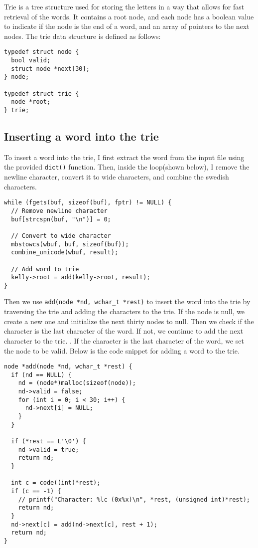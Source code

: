 \documentclass[a4paper,11pt]{article}
\begin{document}
Trie is a tree structure used for storing the letters in a way that allows for fast retrieval of the words.
It contains a root node, and each node has a boolean value to indicate if the node is the end of a word, 
and an array of pointers to the next nodes. The trie data structure is defined as follows:

\begin{verbatim}
typedef struct node {
  bool valid;
  struct node *next[30];
} node;

typedef struct trie {
  node *root;
} trie;
\end{verbatim}

\subsection*{Inserting a word into the trie}

To insert a word into the trie, I first extract the word from the input file using the provided {\tt dict()}
function. Then, inside the loop(shown below), I remove the newline character, convert it to wide characters,
and combine the swedish characters.

\begin{verbatim}
while (fgets(buf, sizeof(buf), fptr) != NULL) {
  // Remove newline character
  buf[strcspn(buf, "\n")] = 0;

  // Convert to wide character
  mbstowcs(wbuf, buf, sizeof(buf));
  combine_unicode(wbuf, result);

  // Add word to trie
  kelly->root = add(kelly->root, result);
}
\end{verbatim}

Then we use {\tt *add(node *nd, wchar\_t *rest)} to insert the word 
into the trie by traversing the trie and adding the characters to the trie. 
If the node is null, we create a new one and initialize the next thirty nodes to null.
Then we check if the character is the last character of the word. If not, we continue to add the next character to the trie.
. If the character is the last character of the word, we set the node to be valid.
Below is the code snippet for adding a word to the trie.

\begin{verbatim}
node *add(node *nd, wchar_t *rest) {
  if (nd == NULL) {
    nd = (node*)malloc(sizeof(node));
    nd->valid = false;
    for (int i = 0; i < 30; i++) {
      nd->next[i] = NULL;
    }
  }

  if (*rest == L'\0') {
    nd->valid = true;
    return nd;
  }

  int c = code((int)*rest);
  if (c == -1) {
    // printf("Character: %lc (0x%x)\n", *rest, (unsigned int)*rest);
    return nd;
  }
  nd->next[c] = add(nd->next[c], rest + 1);
  return nd;
}
\end{verbatim}
\end{document}
